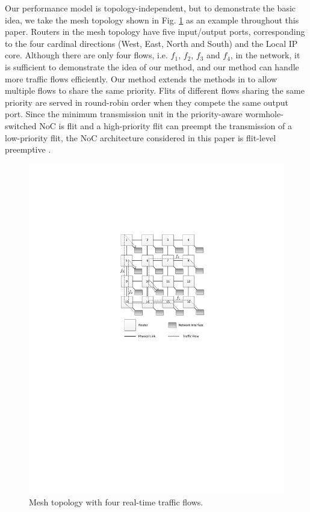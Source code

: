 \documentclass[preprint]{elsarticle}
\begin{document}
Our performance model is topology-independent, but to demonstrate the basic idea, we take the mesh topology shown in Fig. \ref{topology} as an example throughout this paper. Routers in the mesh topology have five input/output ports, corresponding to the four cardinal directions (West, East, North and South) and the Local IP core. Although there are only four flows, i.e. $f_1$, $f_2$, $f_3$ and $f_4$, in the network, it is sufficient to demonstrate the idea of our method, and our method can handle more traffic flows efficiently. Our method extends the methods in \cite{73}\cite{Qian489900} to allow multiple flows to share the same priority. Flits of different flows sharing the same priority are served in round-robin order when they compete the same output port. Since the minimum transmission unit in the priority-aware wormhole-switched NoC is flit and a high-priority flit can preempt the transmission of a low-priority flit, the NoC architecture considered in this paper is flit-level preemptive \cite{Lee:2003:RWC:846077.846083}.
\begin{figure}
  \centering
  \includegraphics[scale=0.85]{fig1.pdf}
  \caption{Mesh topology with four real-time traffic flows.}\label{topology}
\end{figure}
\end{document}
